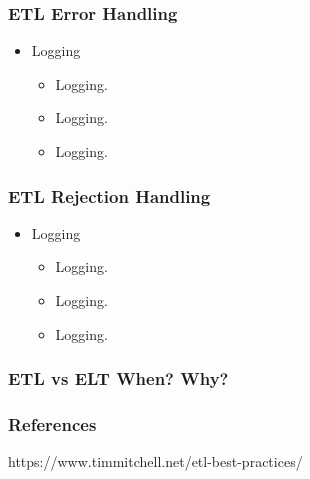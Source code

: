 
\begin{frame}
    \frametitle{ETL Error Handling}
    \begin{itemize}[<+->]
        \item Logging
        \begin{itemize}[<+->]
            \item  Logging.
            \item  Logging.
            \item  Logging.


        \end{itemize}
    \end{itemize}
\end{frame}


\begin{frame}
    \frametitle{ETL Rejection Handling}
    \begin{itemize}[<+->]
        \item Logging
        \begin{itemize}[<+->]
            \item  Logging.
            \item  Logging.
            \item  Logging.


        \end{itemize}
    \end{itemize}
\end{frame}


\begin{frame}
    \frametitle{ETL vs ELT When? Why?}
\end{frame}

\begin{frame}
    \frametitle{References}
    https://www.timmitchell.net/etl-best-practices/
\end{frame}




